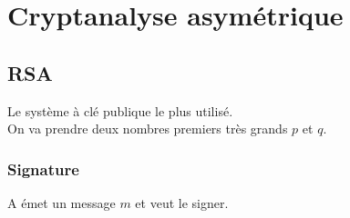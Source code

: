 \section{Cryptanalyse asymétrique}
\subsection{RSA}
Le système à clé publique le plus utilisé.\\
On va prendre deux nombres premiers très grands $p$ et $q$.
\subsubsection{Signature}
A émet un message $m$ et veut le signer.